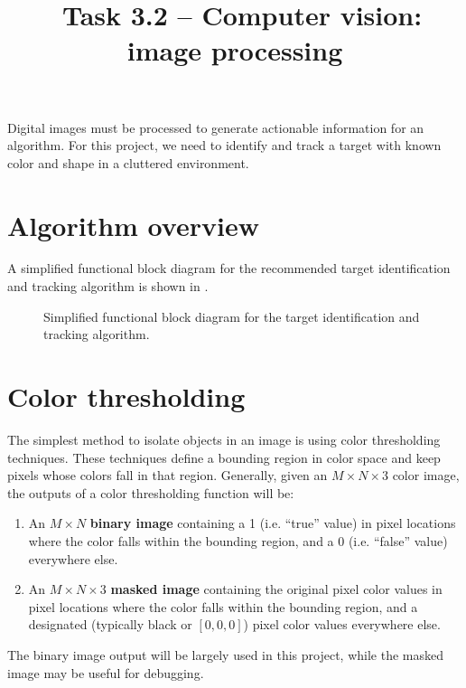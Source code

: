 \documentclass{tufte-handout}
\title{\usnaCourseNumber\ Task 3.2 -- Computer vision: image processing}
\author{\usnaInstructorShort}
\date{\printdate{\courseWeekTwo}}
\begin{document}
\maketitle
Digital images must be processed to generate actionable information for an algorithm. For this project, we need to identify and track a target with known color and shape in a cluttered environment.

\section{Algorithm overview}
A simplified functional block diagram for the recommended target identification and tracking algorithm is shown in .

\begin{figure}
\begin{center}
\end{center}
\caption{Simplified functional block diagram for the target identification and tracking algorithm.}
\label{fig:1}
\end{figure}

\section{Color thresholding}
The simplest method to isolate objects in an image is using color thresholding techniques. These techniques define a bounding region in color space and keep pixels whose colors fall in that region. Generally, given an $M \times N \times 3$ color image, the outputs of a color thresholding function will be:
\begin{enumerate}
\item An $M \times N$ \textbf{binary image} containing a 1 (i.e. ``true'' value) in pixel locations where the color falls within the bounding region, and a 0 (i.e. ``false'' value) everywhere else.
\item An $M \times N \times 3$ \textbf{masked image} containing the original pixel color values in pixel locations where the color falls within the bounding region, and a designated (typically black or $[0,0,0]$) pixel color values everywhere else.
\end{enumerate}
The binary image output will be largely used in this project, while the masked image may be useful for debugging. 
\end{document}
